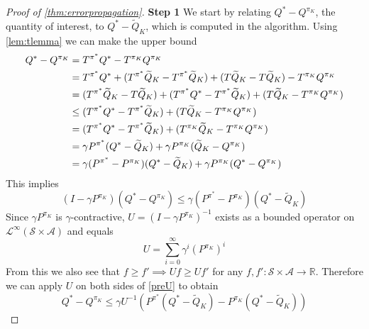 \documentclass{article}
\theoremstyle{definition}
\newcommand{\bb}{\mathbb}
\newcommand{\Cal}{\mathcal}
\newcommand{\R}{\bb{R}}
\newcommand{\wt}{\widetilde}
\begin{document}
\begin{proof}[Proof of \cref{thm:errorpropagation}]
  \textbf{Step 1}
  We start by relating $Q^* - Q^{\pi_K}$, the quantity of interest,
  to $Q^* - \wt{Q}_K$, which is computed in the algorithm.
  Using \cref{lem:tlemma} we can make the upper bound
  \begin{align}
    Q^* - Q^{\pi_K} &= T^{\pi^*} Q^* - T^{\pi_K} Q^{\pi_K} \notag
    \\ &= T^{\pi^*} Q^* + (T^{\pi^*} \wt{Q}_K - T^{\pi^*} \wt{Q}_K)
    + (T \wt{Q}_K - T \wt{Q}_K)- T^{\pi_K} Q^{\pi_K} \notag
    \\ &= (T^{\pi^*} \wt{Q}_K - T \wt{Q}_K)
    + (T^{\pi^*} Q^* - T^{\pi^*} \wt{Q}_K) 
    + (T \wt{Q}_K - T^{\pi_K} Q^{\pi_K}) \notag
    \\ &\leq (T^{\pi^*} Q^* - T^{\pi^*} \wt{Q}_K) 
    + (T \wt{Q}_K - T^{\pi_K} Q^{\pi_K}) \notag
    \\ &= (T^{\pi^*} Q^* - T^{\pi^*} \wt{Q}_K) 
    + (T^{\pi_K} \wt{Q}_K - T^{\pi_K} Q^{\pi_K}) \notag
    \\ &= \gamma P^{\pi^*} (Q^* - \wt{Q}_K)
    + \gamma P^{\pi_K} (\wt{Q}_K - Q^{\pi_K}) \notag
    \\ &= \gamma (P^{\pi^*} - P^{\pi_K})(Q^* - \wt{Q}_K)
    + \gamma P^{\pi_K} (Q^* - Q^{\pi_K}) \label{preU}
  \end{align}
  This implies
  \[ (I - \gamma P^{\pi_K})(Q^* - Q^{\pi_K})
  \leq \gamma (P^{\pi^*} - P^{\pi_K})(Q^* - \wt{Q}_K) \]
  Since $\gamma P^{\pi_K}$ is $\gamma$-contractive,
  $U = (I - \gamma P^{\pi_K})^{-1}$ exists as a bounded operator on
  $\Cal{L}^\infty(\Cal{S}\times \Cal{A})$ and equals
  \[ U = \sum_{i=0}^\infty \gamma^i (P^{\pi_K})^i \] 
  From this we also see that $f \geq f' \implies U f \geq U f'$ for any
  $f, f' : \Cal{S}\times \Cal{A} \to \R$.
  Therefore we can apply $U$ on both sides of \cref{preU} to obtain 
  \begin{equation} Q^* - Q^{\pi_K} \leq \gamma U^{-1}(P^{\pi^*}(Q^* - \wt{Q}_K)
  - P^{\pi_K} (Q^* - \wt{Q}_K)) \label{eq:qq1} \end{equation} 


\end{proof}
\end{document}
